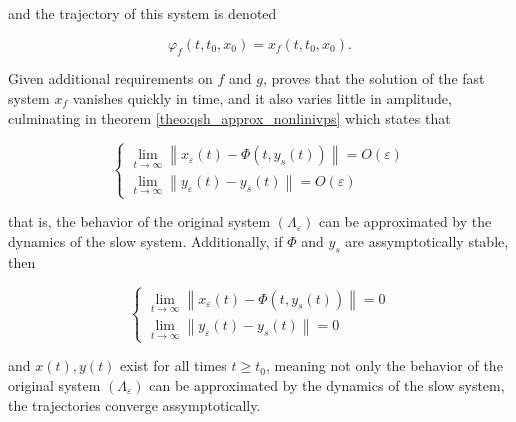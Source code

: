 	\noindent and the trajectory of this system is denoted 

\begin{equation} \varphi_f\left(t,t_0,x_0\right) = x_f\left(t,t_0,x_0\right) .\end{equation}

	Given additional requirements on $f$ and $g$, \cite{Marva2012} proves that the solution of the fast system $x_f$ vanishes quickly in time, and it also varies little in amplitude, culminating in theorem \ref{theo:qsh_approx_nonlinivps} which states that 

\begin{equation}\left\{\begin{array}{l} \lim\limits_{t\to\infty} \left\lVert x_\varepsilon(t) - \Phi\left(t,y_s\left(t\right)\right)\right\rVert = O\left(\varepsilon\right) \\[2mm] \lim\limits_{t\to\infty} \left\lVert y_\varepsilon(t) - y_s(t) \right\rVert = O\left(\varepsilon\right) \end{array}\right. \end{equation}

	\noindent that is, the behavior of the original system $\left(\Lambda_\varepsilon\right)$ can be approximated by the dynamics of the slow system. Additionally, if $\Phi$ and $y_s$ are assymptotically stable, then

\begin{equation}\left\{\begin{array}{l} \lim\limits_{t\to\infty} \left\lVert x_\varepsilon(t) - \Phi\left(t,y_s\left(t\right)\right)\right\rVert = 0 \\[2mm] \lim\limits_{t\to\infty} \left\lVert y_\varepsilon(t) - y_s(t) \right\rVert = 0 \end{array}\right. \end{equation}

	\noindent and $x(t),y(t)$ exist for all times $t\geq t_0$, meaning not only the behavior of the original system $\left(\Lambda_\varepsilon\right)$ can be approximated by the dynamics of the slow system, the trajectories converge assymptotically.

